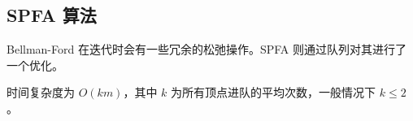 \subsection{SPFA 算法}
	Bellman-Ford 在迭代时会有一些冗余的松弛操作。SPFA 则通过队列对其进行了一个优化。
	
	时间复杂度为 $O(km)$，其中 $k$ 为所有顶点进队的平均次数，一般情况下 $k\leqslant 2$。
	
	